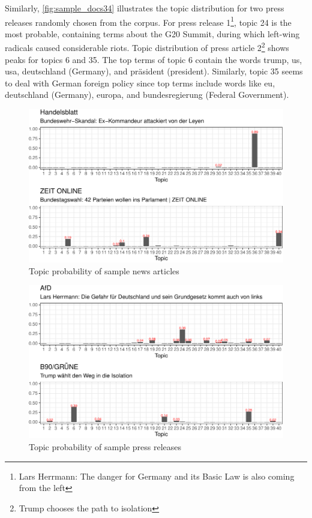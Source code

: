 \documentclass[
  12pt,
]{article}
\begin{document}
Similarly, \autoref{fig:sample_docs34} illustrates the topic
distribution for two press releases randomly chosen from the corpus. For
press release 1\footnote{Lars Herrmann: The danger for Germany and its
  Basic Law is also coming from the left}, topic 24 is the most
probable, containing terms about the G20 Summit, during which left-wing
radicals caused considerable riots. Topic distribution of press article
2\footnote{Trump chooses the path to isolation} shows peaks for topics 6
and 35. The top terms of topic 6 contain the words trump, us, usa,
deutschland (Germany), and präsident (president). Similarly, topic 35
seems to deal with German foreign policy since top terms include words
like eu, deutschland (Germany), europa, and bundesregierung (Federal
Government).

\begin{figure}

{\centering \includegraphics[width=0.9\linewidth]{main_text_files/figure-latex/News articles sample documents-1} 

}

\caption{Topic probability of sample news articles \label{fig:sample_docs12}}\label{fig:News articles sample documents}
\end{figure}

\begin{figure}

{\centering \includegraphics[width=0.9\linewidth]{main_text_files/figure-latex/Press releases sample documents-1} 

}

\caption{Topic probability of sample press releases \label{fig:sample_docs34}}\label{fig:Press releases sample documents}
\end{figure}
\end{document}
